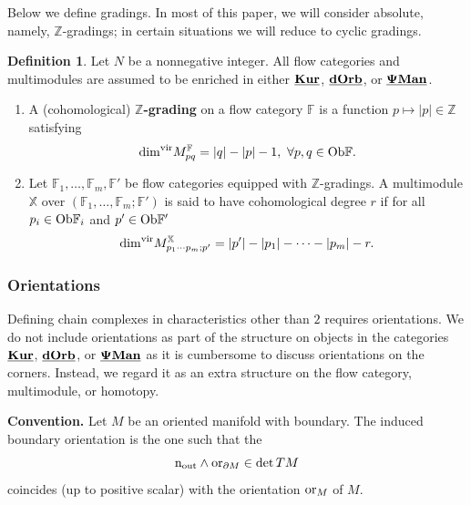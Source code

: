 \documentclass[reqno, 10pt]{amsart}
\numberwithin{equation}{section}
\numberwithin{equation}{section}
\theoremstyle{definition}
\newtheorem{defn}[thm]{Definition}
\theoremstyle{remark}
\newcommand{\beqn}{\begin{equation*}}
\newcommand{\eeqn}{\end{equation*}}
\newcommand{\mb}{\mathbb}
\newcommand{\pman}{\uds{{\bf \Psi}{\bf Man}}}
\newcommand{\uds}[1]{\underline{\smash{#1}}}
\begin{document}
Below we define gradings. In most of this paper, we will consider absolute, namely, ${\mb Z}$-gradings; in certain situations we will reduce to cyclic gradings.

\begin{defn}\label{defn_grading}
Let $N$ be a nonnegative integer. All flow categories and multimodules are assumed to be %
enriched in either $\uds{\bf Kur}$, $\uds{\bf dOrb}$, or $\pman$.
\begin{enumerate}

\item A (cohomological) {\bf ${\mb Z}$-grading} on a flow category ${\mb F}$ is a %
function $p \mapsto |p| \in {\mb Z}$ satisfying 
\beqn
{\rm dim}^{\rm vir} M_{pq}^{\mb F} = |q| - |p| - 1,\ \forall p, q \in {\rm Ob}{\mb F}.
\eeqn

\item Let ${\mb F}_1, \ldots, {\mb F}_m, {\mb F}'$ be flow categories equipped with ${\mb Z}$-gradings. A multimodule ${\mb X}$ over $({\mb F}_1, \ldots, {\mb F}_m; {\mb F}')$ is said to have cohomological degree $r$ if for all $p_i \in {\rm Ob} {\mb F}_i$ and $p' \in {\rm Ob}{\mb F}'$ 
\beqn
{\rm dim}^{\rm vir} M_{p_1\cdots p_m;p'}^{\mb X} = |p'| - |p_1| - \cdots - |p_m| - r.
\eeqn

\end{enumerate}
\end{defn}



\subsubsection{Orientations}\label{subsubsec:orientation}


Defining chain complexes in characteristics other than $2$ requires orientations. We do not include orientations as part of the structure on objects in the categories $\uds{\bf Kur}$, $\uds{\bf dOrb}$, or $\pman$ as it is cumbersome to discuss orientations on the corners. Instead, we regard it as an extra structure on the flow category, multimodule, or homotopy.

{\bf Convention.} Let $M$ be an oriented manifold with boundary. The induced boundary orientation is the one such that the 
\beqn
{\rm n}_{\rm out} \wedge {\rm or}_{\partial M} \in \det TM
\eeqn
coincides (up to positive scalar) with the orientation ${\rm or}_M$ of $M$. 
\end{document}
